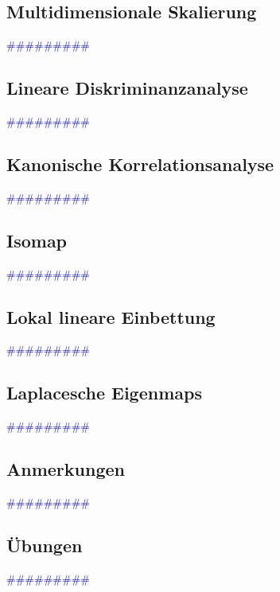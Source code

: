 \documentclass{article}
\begin{document}
  \subsection{Multidimensionale Skalierung} %
      \textcolor{blue}{\#\#\#\#\#\#\#\#\#}
  \subsection{Lineare Diskriminanzanalyse} %
      \textcolor{blue}{\#\#\#\#\#\#\#\#\#}
  \subsection{Kanonische Korrelationsanalyse} %
      \textcolor{blue}{\#\#\#\#\#\#\#\#\#}
  \subsection{Isomap} %
      \textcolor{blue}{\#\#\#\#\#\#\#\#\#}
  \subsection{Lokal lineare Einbettung} %
      \textcolor{blue}{\#\#\#\#\#\#\#\#\#}
  \subsection{Laplacesche Eigenmaps} %
      \textcolor{blue}{\#\#\#\#\#\#\#\#\#}
  \subsection{Anmerkungen} %
      \textcolor{blue}{\#\#\#\#\#\#\#\#\#}
  \subsection{Übungen} %
      \textcolor{blue}{\#\#\#\#\#\#\#\#\#}
\end{document}
